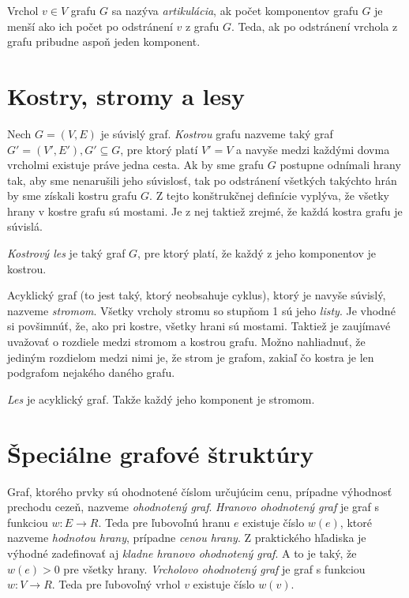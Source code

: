 Vrchol $v \in V$ grafu $G$ sa nazýva \textit{artikulácia}, ak počet komponentov grafu $G$ je menší ako ich počet po odstránení $v$ z grafu $G$. Teda, ak po odstránení vrchola z grafu pribudne aspoň jeden komponent.\newline


\section{Kostry, stromy a lesy}

Nech $G = (V, E)$ je súvislý graf. \textit{Kostrou} grafu nazveme taký graf $G' = (V', E'), G'\subseteq G$, pre ktorý platí $V' = V$ a navyše medzi každými dovma vrcholmi existuje práve jedna cesta. Ak by sme grafu $G$ postupne odnímali hrany tak, aby sme nenarušili jeho súvislosť, tak po odstránení všetkých takýchto hrán by sme získali kostru grafu $G$. Z tejto konštrukčnej definície vyplýva, že všetky hrany v kostre grafu sú mostami. Je z nej taktiež zrejmé, že každá kostra grafu je súvislá.\newline

\textit{Kostrový les} je taký graf $G$, pre ktorý platí, že každý z jeho komponentov je kostrou.\newline

Acyklický graf (to jest taký, ktorý neobsahuje cyklus), ktorý je navyše súvislý, nazveme \textit{stromom}. Všetky vrcholy stromu so stupňom 1 sú jeho \textit{listy}. Je vhodné si povšimnúť, že, ako pri kostre, všetky hrani sú mostami. Taktiež je zaujímavé uvažovať o rozdiele medzi stromom a kostrou grafu. Možno nahliadnuť, že jediným rozdielom medzi nimi je, že strom je grafom, zakiaľ čo kostra je len podgrafom nejakého daného grafu.\newline

\textit{Les} je acyklický graf. Takže každý jeho komponent je stromom.\newline


\section{Špeciálne grafové štruktúry}

Graf, ktorého prvky sú ohodnotené číslom určujúcim cenu, prípadne výhodnosť prechodu cezeň, nazveme \textit{ohodnotený graf}. \textit{Hranovo ohodnotený graf} je graf s funkciou $w: E\rightarrow R$. Teda pre ľubovoľnú hranu $e$ existuje číslo $w(e)$, ktoré nazveme \textit{hodnotou hrany}, prípadne \textit{cenou hrany}.  Z praktického hľadiska je výhodné zadefinovať aj \textit{kladne hranovo ohodnotený graf}. A to je taký, že $w(e) > 0$ pre všetky hrany. \textit{Vrcholovo ohodnotený graf} je graf s funkciou $w: V\rightarrow R$. Teda pre ľubovoľný vrhol $v$ existuje číslo $w(v)$. \newline

